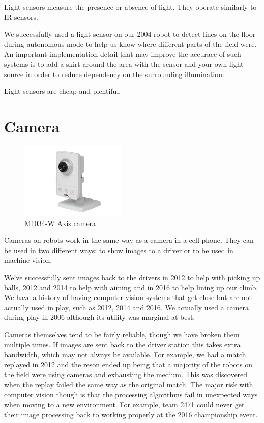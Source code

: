 \documentclass{article}
\begin{document}
Light sensors measure the presence or absence of light.  They operate similarly to IR sensors.  

We successfully used a light sensor on our 2004 robot to detect lines on the floor during autonomous mode to help us know where different parts of the field were.  An important implementation detail that may improve the accurace of such systems is to add a skirt around the area with the sensor and your own light source in order to reduce dependency on the surrounding illumination.  

Light sensors are cheap and plentiful.

\section{Camera}

\begin{figure}[ht]
\centering
\includegraphics[width=2in]{M1034-W_axis_camera_large_2.jpg}
\caption{M1034-W Axis camera}
\end{figure}

Cameras on robots work in the same way as a camera in a cell phone.  They can be used in two different ways: to show images to a driver or to be used in machine vision.  

We've successfully sent images back to the drivers in 2012 to help with picking up balls, 2012 and 2014 to help with aiming and in 2016 to help lining up our climb.  We have a history of having computer vision systems that get close but are not actually used in play, such as 2012, 2014 and 2016.  We actually used a camera during play in 2006 although its utility was marginal at best.  

Cameras themselves tend to be fairly reliable, though we have broken them multiple times.  If images are sent back to the driver station this takes extra bandwidth, which may not always be available.  For example, we had a match replayed in 2012 and the reson ended up being that a majority of the robots on the field were using cameras and exhausting the medium.  This was discovered when the replay failed the same way as the original match.  The major risk with computer vision though is that the processing algorithms fail in unexpected ways when moving to a new environment.  For example, team 2471 could never get their image processing back to working properly at the 2016 championship event.  
\end{document}
